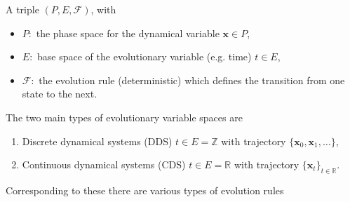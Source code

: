 \begin{definition}
	A triple $(P,E, \mathcal{F})$, with
	\begin{itemize}
		\item $P :$ the phase space for the dynamical variable $\textbf{x} \in P$,
		\item  $E:$ base space of the evolutionary variable (e.g. time) $t \in E$,
		\item $\mathcal{F}: $ the evolution rule (deterministic) which defines the transition from one state to the next.
\end{itemize}
\end{definition}
The two main types of evolutionary variable spaces are
\begin{enumerate}
	\item Discrete dynamical systems (DDS) $t\in E=\mathbb{Z}$ with trajectory $\{ \textbf{x}_0,  \textbf{x}_1, \ldots\}$,
	\item Continuous dynamical systems (CDS) $t\in E=\mathbb{R}$ with trajectory $\{ \textbf{x}_t\}_{t \in \mathbb{R}}$.
\end{enumerate}
Corresponding to these there are various types of evolution rules
